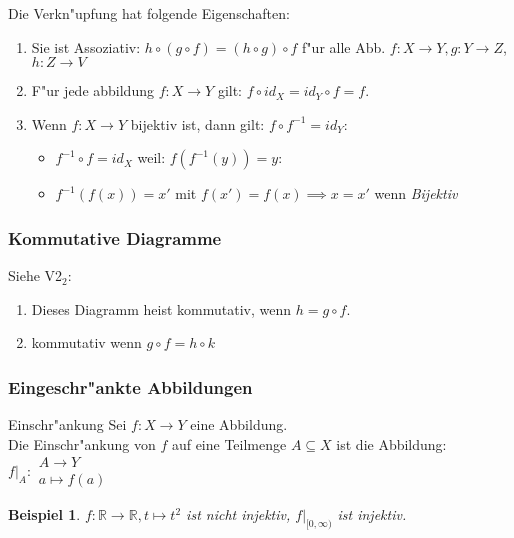 \documentclass[11pt]{article}
\newtheorem{exa}{Beispiel}[section]
\begin{document}
Die Verkn"upfung hat folgende Eigenschaften:
\begin{relation}
\begin{enumerate}
\item Sie ist Assoziativ: \(h\circ (g\circ f) = (h \circ g) \circ f\) f"ur alle Abb. \(f: X\to Y, g:Y\to Z\), \(h:Z\to V\)
\item F"ur jede abbildung \(f: X\to Y\) gilt: \(f\circ id_X=id_Y\circ f = f\).
\item Wenn \(f:X\to Y\) bijektiv ist, dann gilt: \(f\circ f^{-1}=id_Y\):
\begin{itemize}
\item \(f^{-1}\circ f=id_X\) weil: \(f(f^{-1}(y))=y\):
\item \(f^{-1}(f(x))=x'\) mit \(f(x')=f(x)\implies x=x'\) wenn \emph{Bijektiv}
\end{itemize}
\end{enumerate}
\end{relation}

\subsubsection{Kommutative Diagramme}
\label{sec:org429b8d6}
Siehe V2\(_{\text{2}}\): 
\begin{enumerate}
\item Dieses Diagramm heist kommutativ, wenn \(h=g\circ f\).
\item kommutativ wenn \(g\circ f=h\circ k\)
\end{enumerate}

\subsubsection{Eingeschr"ankte Abbildungen}
\label{sec:org60b2559}
\begin{definition}{Einschr"ankung}{}
Sei \(f: X\to Y\) eine Abbildung.\\
Die Einschr"ankung von \(f\) auf eine Teilmenge \(A\subseteq X\) ist die  Abbildung:
\(f|_A:\begin{matrix}A\to Y\\ a\mapsto f(a)\end{matrix}\)
\end{definition}

\begin{exa}
\(f: \mathbb{R}\to \mathbb{R}, t\mapsto t^{2}\) ist nicht injektiv, \(f|_{[0,
\infty)}\) ist injektiv.
\end{exa}
\end{document}
